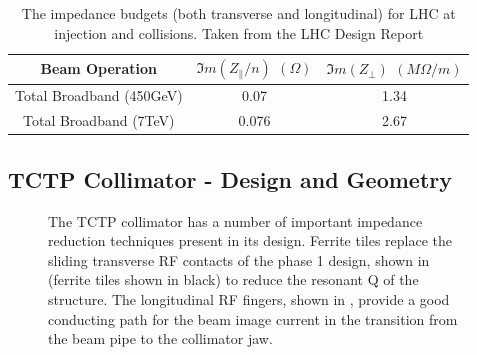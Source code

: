 \begin{table}
\caption{The impedance budgets (both transverse and longitudinal) for LHC at injection and collisions. Taken from the LHC Design Report \cite{Ruggiero:LHCColEff}}
\begin{center}
\begin{tabular}{c | c | c}
Beam Operation & $\Im{}m ( Z_{\parallel}/n )$ $( \Omega )$ & $\Im{}m ( Z_{\perp} )$ $(M \Omega /m )$\\ \hline
Total Broadband (450GeV) & 0.07 & 1.34 \\ \hline
Total Broadband (7TeV) & 0.076 & 2.67 \\ \hline
\end{tabular}
\end{center}
\label{tab:lhc-impedance-budget}
\end{table}

\subsection{TCTP Collimator - Design and Geometry}

\begin{figure}
\caption{The TCTP collimator has a number of important impedance reduction techniques present in its design. Ferrite tiles replace the sliding transverse RF contacts of the phase 1 design, shown in  (ferrite tiles shown in black) to reduce the resonant Q of the structure. The longitudinal RF fingers, shown in , provide a good conducting path for the beam image current in the transition from the beam pipe to the collimator jaw.}
\label{fig:tctp-figure}
\end{figure}

